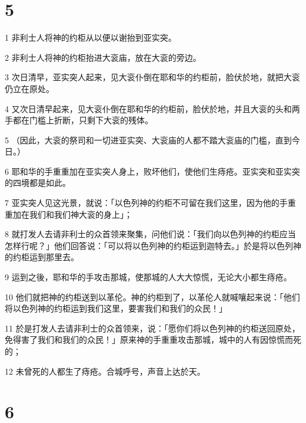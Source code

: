 \chapter{5}

\par 1 非利士人将神的约柜从以便以谢抬到亚实突。
\par 2 非利士人将神的约柜抬进大衮庙，放在大衮的旁边。
\par 3 次日清早，亚实突人起来，见大衮仆倒在耶和华的约柜前，脸伏於地，就把大衮仍立在原处。
\par 4 又次日清早起来，见大衮仆倒在耶和华的约柜前，脸伏於地，并且大衮的头和两手都在门槛上折断，只剩下大衮的残体。
\par 5 （因此，大衮的祭司和一切进亚实突、大衮庙的人都不踏大衮庙的门槛，直到今日。）
\par 6 耶和华的手重重加在亚实突人身上，败坏他们，使他们生痔疮。亚实突和亚实突的四境都是如此。
\par 7 亚实突人见这光景，就说：「以色列神的约柜不可留在我们这里，因为他的手重重加在我们和我们神大衮的身上」；
\par 8 就打发人去请非利士的众首领来聚集，问他们说：「我们向以色列神的约柜应当怎样行呢？」他们回答说：「可以将以色列神的约柜运到迦特去。」於是将以色列神的约柜运到那里去。
\par 9 运到之後，耶和华的手攻击那城，使那城的人大大惊慌，无论大小都生痔疮。
\par 10 他们就把神的约柜送到以革伦。神的约柜到了，以革伦人就喊嚷起来说：「他们将以色列神的约柜运到我们这里，要害我们和我们的众民！」
\par 11 於是打发人去请非利士的众首领来，说：「愿你们将以色列神的约柜送回原处，免得害了我们和我们的众民！」原来神的手重重攻击那城，城中的人有因惊慌而死的；
\par 12 未曾死的人都生了痔疮。合城呼号，声音上达於天。

\chapter{6}

